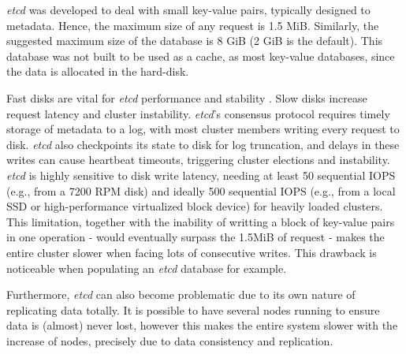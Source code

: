 \documentclass[screen,review]{acmart}
\begin{document}
\textit{etcd} was developed to deal with small key-value pairs, typically designed to metadata. Hence, the maximum size of any request is 1.5 MiB. Similarly, the suggested maximum size of the database is 8 GiB (2 GiB is the default). This database was not built to be used as a cache, as most key-value databases\cite{etcd_sys_limits}, since the data is allocated in the hard-disk.

Fast disks are vital for \textit{etcd} performance and stability \cite{etcd_hw}. Slow disks increase request latency and cluster instability. \textit{etcd}'s consensus protocol requires timely storage of metadata to a log, with most cluster members writing every request to disk. \textit{etcd} also checkpoints its state to disk for log truncation, and delays in these writes can cause heartbeat timeouts, triggering cluster elections and instability. \textit{etcd} is highly sensitive to disk write latency, needing at least 50 sequential IOPS (e.g., from a 7200 RPM disk) and ideally 500 sequential IOPS (e.g., from a local SSD or high-performance virtualized block device) for heavily loaded clusters. This limitation, together with the inability of writting a block of key-value pairs in one operation - would eventually surpass the 1.5MiB of request - makes the entire cluster slower when facing lots of consecutive writes. This drawback is noticeable when populating an \textit{etcd} database for example.

Furthermore, \textit{etcd} can also become problematic due to its own nature of replicating data totally. It is possible to have several nodes running to ensure data is (almost) never lost, however this makes the entire system slower with the increase of nodes, precisely due to data consistency and replication.
\end{document}
